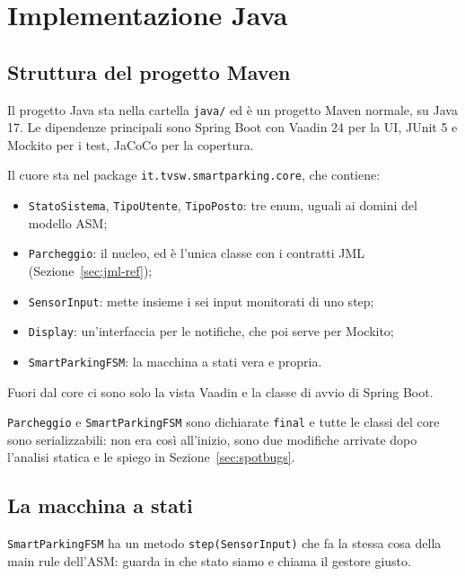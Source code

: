 \section{Implementazione Java}

\subsection{Struttura del progetto Maven}

Il progetto Java sta nella cartella \texttt{java/} ed è un progetto Maven normale, su
Java 17. Le dipendenze principali sono Spring Boot con Vaadin 24 per la UI, JUnit 5 e
Mockito per i test, JaCoCo per la copertura.

Il cuore sta nel package \texttt{it.tvsw.smartparking.core}, che contiene:

\begin{itemize}
    \item \texttt{StatoSistema}, \texttt{TipoUtente}, \texttt{TipoPosto}: tre enum, uguali ai domini del modello ASM;
    \item \texttt{Parcheggio}: il nucleo, ed è l'unica classe con i contratti JML (Sezione~\ref{sec:jml-ref});
    \item \texttt{SensorInput}: mette insieme i sei input monitorati di uno step;
    \item \texttt{Display}: un'interfaccia per le notifiche, che poi serve per Mockito;
    \item \texttt{SmartParkingFSM}: la macchina a stati vera e propria.
\end{itemize}

Fuori dal core ci sono solo la vista Vaadin e la classe di avvio di Spring Boot.

\texttt{Parcheggio} e \texttt{SmartParkingFSM} sono dichiarate \texttt{final} e tutte
le classi del core sono serializzabili: non era così all'inizio, sono due modifiche
arrivate dopo l'analisi statica e le spiego in Sezione~\ref{sec:spotbugs}.

\subsection{La macchina a stati}

\texttt{SmartParkingFSM} ha un metodo \texttt{step(SensorInput)} che fa la stessa cosa
della main rule dell'ASM: guarda in che stato siamo e chiama il gestore giusto.

